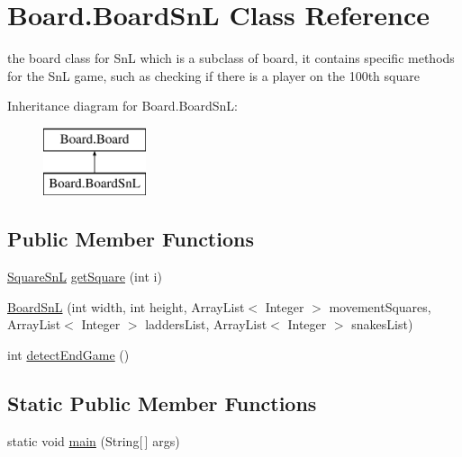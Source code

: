 \hypertarget{class_board_1_1_board_sn_l}{}\section{Board.\+Board\+Sn\+L Class Reference}
\label{class_board_1_1_board_sn_l}


the board class for Sn\+L which is a subclass of board, it contains specific methods for the Sn\+L game, such as checking if there is a player on the 100th square  


Inheritance diagram for Board.\+Board\+Sn\+L\+:\begin{figure}[H]
\begin{center}
\leavevmode
\includegraphics[height=2.000000cm]{class_board_1_1_board_sn_l}
\end{center}
\end{figure}
\subsection*{Public Member Functions}
\begin{DoxyCompactItemize}
\item 
\hyperlink{class_square_1_1_square_sn_l}{Square\+Sn\+L} \hyperlink{class_board_1_1_board_sn_l_a808a8299c5ee4a8256b5e68915fd9eca}{get\+Square} (int i)
\item 
\hyperlink{class_board_1_1_board_sn_l_a03f7b8911496b68ad4de0d1b0939220a}{Board\+Sn\+L} (int width, int height, Array\+List$<$ Integer $>$ movement\+Squares, Array\+List$<$ Integer $>$ ladders\+List, Array\+List$<$ Integer $>$ snakes\+List)
\item 
int \hyperlink{class_board_1_1_board_sn_l_aae2b39e92ddf94fefa4bc86a3bdb6055}{detect\+End\+Game} ()
\end{DoxyCompactItemize}
\subsection*{Static Public Member Functions}
\begin{DoxyCompactItemize}
\item 
static void \hyperlink{class_board_1_1_board_sn_l_a528d4e87b3553f7c0bdb7b5a0a3685d5}{main} (String\mbox{[}$\,$\mbox{]} args)
\end{DoxyCompactItemize}
